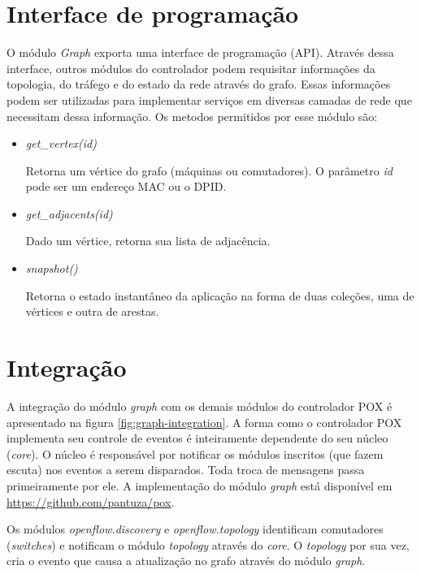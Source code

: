 \section{Interface de programação}

O módulo \emph{Graph} exporta uma interface de programação (API).
Através dessa interface, outros módulos do controlador podem requisitar 
informações da topologia, do tráfego e do estado da rede através do grafo.
Essas informações podem ser utilizadas para implementar serviços em diversas
camadas de rede que necessitam dessa informação.
Os metodos permitidos por esse módulo são:

\begin{itemize}
    \item \emph{get\_vertex(id)}

        Retorna um vértice do grafo (máquinas ou comutadores). 
        O parâmetro \emph{id} pode ser um endereço MAC ou o DPID.

    \item \emph{get\_adjacents(id)}

        Dado um vértice, retorna sua lista de adjacência.

    \item \emph{snapshot()}

        Retorna o estado instantâneo da aplicação na forma de duas coleções,
        uma de vértices e outra de arestas.
\end{itemize}

\section{Integração}

A integração do módulo \emph{graph} com os demais módulos do controlador POX
é apresentado na figura \ref{fig:graph-integration}.
A forma como o controlador POX implementa seu controle de eventos é 
inteiramente dependente do seu núcleo (\emph{core}).
O núcleo é responsável por notificar os módulos inscritos (que fazem escuta) 
nos eventos a serem disparados.
Toda troca de mensagens passa primeiramente por ele.
A implementação do módulo \emph{graph} está disponível em 
\url{https://github.com/pantuza/pox}.

Os módulos \emph{openflow.discovery} e \emph{openflow.topology} identificam 
comutadores (\emph{switches}) e notificam o módulo \emph{topology} através do
\emph{core}. 
O \emph{topology} por sua vez, cria o evento que causa a atualização no grafo
através do módulo \emph{graph}.

